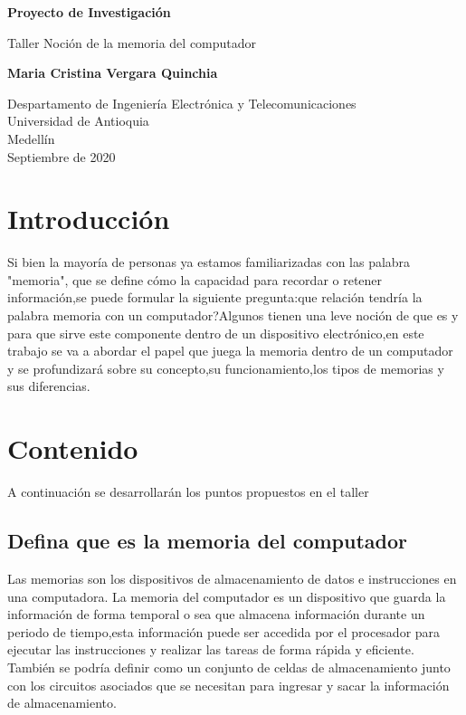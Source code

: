 \documentclass{article}
\begin{document}
\begin{titlepage}
    \begin{center}
        \vspace*{1cm}
            
        \Huge
        \textbf{Proyecto de Investigación}
            
        \vspace{0.5cm}
        \LARGE
        Taller Noción de la memoria del computador
            
        \vspace{1.5cm}
            
        \textbf{Maria Cristina Vergara Quinchia}
            
        \vfill
            
        \vspace{0.8cm}
            
        \Large
        Despartamento de Ingeniería Electrónica y Telecomunicaciones\\
        Universidad de Antioquia\\
        Medellín\\
        Septiembre de 2020
            
    \end{center}
\end{titlepage}

\tableofcontents
\newpage
\section{Introducción}\label{intro}
Si bien la mayoría de personas ya estamos familiarizadas con las palabra "memoria", que se  define cómo la capacidad para recordar o retener información,se puede formular la siguiente pregunta:que relación tendría la palabra memoria con un computador?Algunos tienen una leve noción de que es y para que sirve este componente dentro de un dispositivo electrónico,en este trabajo se va a abordar el papel que juega la memoria dentro de un computador y se profundizará sobre su concepto,su funcionamiento,los tipos de memorias y sus diferencias.


\section{Contenido} \label{contenido}
A continuación se desarrollarán los puntos propuestos en el taller 
\subsection{Defina que es la memoria del computador}
Las memorias son los dispositivos de almacenamiento de datos e instrucciones en una computadora.\cite{UNT}
La memoria del computador es un dispositivo que guarda la información de forma temporal o sea que almacena información durante un periodo de tiempo,esta información puede ser accedida  por el procesador para ejecutar las instrucciones y realizar las tareas de forma rápida y eficiente.
También se podría definir como un conjunto de celdas de almacenamiento junto con los circuitos asociados que se necesitan para ingresar y sacar la información de almacenamiento.\cite{FIng}
\end{document}
